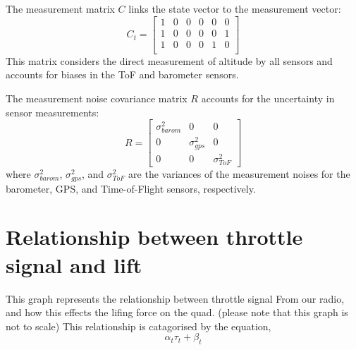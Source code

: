 \documentclass{article}
\begin{document}
The measurement matrix \( C \) links the state vector to the measurement vector:
\begin{equation}
C_t = 
\begin{bmatrix}
1 & 0 & 0 & 0 & 0 & 0 \\
1 & 0 & 0 & 0 & 0 & 1 \\
1 & 0 & 0 & 0 & 1 & 0 \\
\end{bmatrix}
\end{equation}
This matrix considers the direct measurement of altitude by all sensors and accounts for biases in the ToF and barometer sensors.

The measurement noise covariance matrix \( R \) accounts for the uncertainty in sensor measurements:
\begin{equation}
R = 
\begin{bmatrix}
\sigma_{barom}^2 & 0 & 0 \\
0 & \sigma_{gps}^2 & 0 \\
0 & 0 & \sigma_{ToF}^2
\end{bmatrix}
\end{equation}
where \( \sigma_{barom}^2 \), \( \sigma_{gps}^2 \), and \( \sigma_{ToF}^2 \) are the variances of the measurement noises for the barometer, GPS, and Time-of-Flight sensors, respectively.

\section{Relationship between throttle signal and lift}
\begin{figure}[H]
    \centering
    \label{fig:fig1}
    \caption{}
\end{figure}
This graph represents the relationship between throttle signal 
From our radio, and how this effects the lifing force on the quad.
(please note that this graph is not to scale)
This relationship is catagorised by the equation, 
\[
\alpha_t\tau_t + \beta_t
\]
\end{document}
